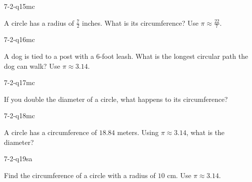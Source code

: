 \begin{practiceQuestion}{7-2-q15}{mc}
\begin{questionText}
A circle has a radius of $\frac{7}{2}$ inches. What is its circumference? Use $\pi \approx \frac{22}{7}$.
\end{questionText}
\end{practiceQuestion}

\begin{practiceQuestion}{7-2-q16}{mc}
\begin{questionText}
A dog is tied to a post with a $6$-foot leash. What is the longest circular path the dog can walk? Use $\pi \approx 3.14$.
\end{questionText}
\end{practiceQuestion}

\begin{practiceQuestion}{7-2-q17}{mc}
\begin{questionText}
If you double the diameter of a circle, what happens to its circumference?
\end{questionText}
\end{practiceQuestion}

\begin{practiceQuestion}{7-2-q18}{mc}
\begin{questionText}
A circle has a circumference of $18.84$ meters. Using $\pi \approx 3.14$, what is the diameter?
\end{questionText}
\end{practiceQuestion}


\begin{practiceQuestion}{7-2-q19}{sa}
\begin{questionText}
Find the circumference of a circle with a radius of $10$ cm. Use $\pi \approx 3.14$.
\end{questionText}
\end{practiceQuestion}

